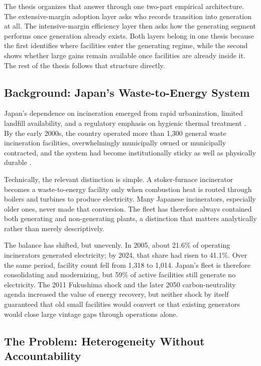 \documentclass[12pt,a4paper]{article}
\begin{document}
The thesis organizes that answer through one two-part empirical architecture. The extensive-margin adoption layer asks who records transition into generation at all. The intensive-margin efficiency layer then asks how the generating segment performs once generation already exists. Both layers belong in one thesis because the first identifies where facilities enter the generating regime, while the second shows whether large gains remain available once facilities are already inside it. The rest of the thesis follows that structure directly.

\subsection{Background: Japan's Waste-to-Energy System}

Japan's dependence on incineration emerged from rapid urbanization, limited landfill availability, and a regulatory emphasis on hygienic thermal treatment \citep{TabataTsai2016}. By the early 2000s, the country operated more than 1,300 general waste incineration facilities, overwhelmingly municipally owned or municipally contracted, and the system had become institutionally sticky as well as physically durable \citep{MOEJ2022}.

Technically, the relevant distinction is simple. A stoker-furnace incinerator becomes a waste-to-energy facility only when combustion heat is routed through boilers and turbines to produce electricity. Many Japanese incinerators, especially older ones, never made that conversion. The fleet has therefore always contained both generating and non-generating plants, a distinction that matters analytically rather than merely descriptively.

The balance has shifted, but unevenly. In 2005, about 21.6\% of operating incinerators generated electricity; by 2024, that share had risen to 41.1\%. Over the same period, facility count fell from 1,318 to 1,014. Japan's fleet is therefore consolidating and modernizing, but 59\% of active facilities still generate no electricity. The 2011 Fukushima shock and the later 2050 carbon-neutrality agenda increased the value of energy recovery, but neither shock by itself guaranteed that old small facilities would convert or that existing generators would close large vintage gaps through operations alone.

\subsection{The Problem: Heterogeneity Without Accountability}
\end{document}
